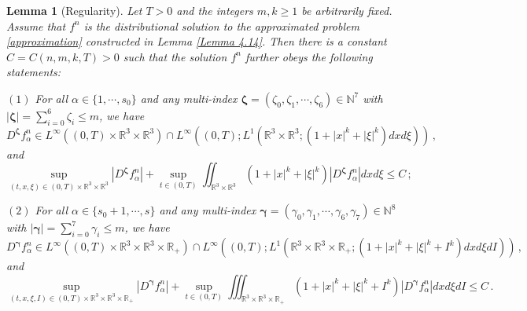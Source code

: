 \documentclass[reqno,11pt]{amsart}
\newtheorem{lemma}{Lemma}[section]
\numberwithin{equation}{section}
\def\R{\mathbb{R}}
\begin{document}
\begin{lemma}[Regularity]\label{Lemma 4.16}
Let $T > 0$ and the integers $m,k\geq 1$ be arbitrarily fixed. Assume that $f^n$ is the distributional solution to the approximated problem \eqref{approximation} constructed in Lemma \ref{Lemma 4.14}. Then there is a constant $ C = C (n, m, k, T) > 0 $ such that the solution $f^n$ further obeys the following statements:

$(1)$ {For all $ \alpha \in \{1,\cdots,s_0\}$ and any multi-index $ \boldsymbol{\zeta} = ( \zeta_0, \zeta_1, \cdots, \zeta_6 ) \in \mathbb{N}^7$ with $| \boldsymbol{\zeta} | = \sum_{i=0}^{6} \zeta_i \leq m$, we have 
$$D^{ \boldsymbol{\zeta} } f^n_\alpha \in L^\infty ((0,T) \times \R^3 \times \R^3 ) \cap L^\infty ( (0, T); L^1 ( \R^3 \times \R^3; (1 + |x|^k + |\xi|^k) d x d \xi ) ) \,, $$
and 
\begin{equation*}
  \sup_{ (t,x,\xi) \in (0,T) \times \R^3 \times \R^3 } | D^{ \boldsymbol{\zeta} } f^n_\alpha | + \sup_{t \in (0, T)} \iint_{\R^3 \times \R^3 } (1+|x|^k+|\xi|^k ) | D^{ \boldsymbol{\zeta} } f^n_\alpha |dxd\xi \leq C \,;
\end{equation*} }

$(2)$ {For all $\alpha \in \{s_0+1,\cdots,s\}$ and any multi-index $\boldsymbol{ \gamma } = (\gamma_0, \gamma_1, \cdots, \gamma_6, \gamma_7) \in \mathbb{N}^8$ with $| \boldsymbol{ \gamma } | = \sum_{i=0}^{7} \gamma_i \leq m$, we have
{\small
$$ D^{ \boldsymbol{ \gamma } } f^n_\alpha \in L^\infty ((0,T)\times \R^3 \times \R^3 \times \R_+) \cap L^\infty ( (0, T); L^1 ( \R^3 \times \R^3 \times \R_+; (1 + |x|^k + |\xi|^k + I^k) d x d \xi d I ) ) \,, $$ }
and
\begin{equation*}
	\sup_{ (t,x,\xi, I) \in (0,T) \times \R^3 \times \R^3 \times \R_+ } | D^{ \boldsymbol{\gamma} } f^n_\alpha | + \sup_{t \in (0, T)} \iiint_{\R^3 \times \R^3 \times \R_+ } (1+|x|^k+|\xi|^k + I^k) | D^{ \boldsymbol{ \gamma } } f^n_\alpha |dxd\xi dI \leq C \,.
	\end{equation*}	}	
\end{lemma}
\end{document}
